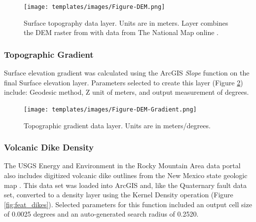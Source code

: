 \begin{figure}[!htp]
\centering
\texttt{[image: templates/images/Figure-DEM.png]}
\caption[Surface topography data layer]{Surface topography data layer. Units are in meters. Layer combines the DEM raster from \citep{bielicki_hydrogeolgic_2015} with data from The National Map online \citep{usgs_tnm_2021}.}
\label{fig:feat_dem}
\end{figure}

\subsubsection{Topographic Gradient}

Surface elevation gradient was calculated using the ArcGIS \textit{Slope} function on the final Surface elevation layer. Parameters selected to create this layer (Figure \ref{fig:feat_dem_gradient}) include: Geodesic method, Z unit of meters, and output measurement of degrees.

\begin{figure}[!htp]
\centering
\texttt{[image: templates/images/Figure-DEM-Gradient.png]}
\caption[Topographic gradient data layer]{Topographic gradient data layer. Units are in meters/degrees.}
\label{fig:feat_dem_gradient}
\end{figure}

\subsubsection{Volcanic Dike Density}

The USGS Energy and Environment in the Rocky Mountain Area data portal \citep{usgs_eerma_2021} also includes digitized volcanic dike outlines from the New Mexico state geologic map \citep{stoeser_new_2005-1}. This data set was loaded into ArcGIS and, like the Quaternary fault data set, converted to a density layer using the Kernel Density operation (Figure \ref{fig:feat_dikes}). Selected parameters for this function included an output cell size of 0.0025 degrees and an auto-generated search radius of 0.2520.

